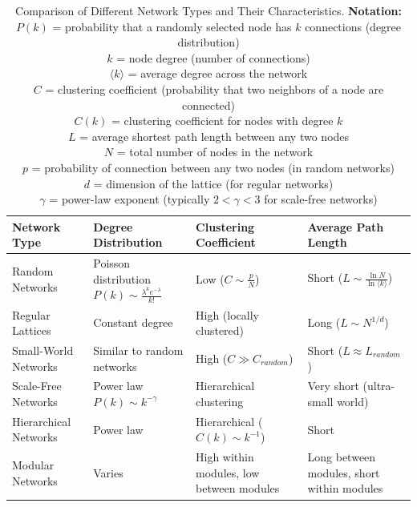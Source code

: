 \begin{table}[htbp]
    \centering
    \begin{tabular}{p{2.5cm}|p{3cm}|p{3cm}|p{3cm}}
        \hline
        \textbf{Network Type} & \textbf{Degree Distribution} & \textbf{Clustering Coefficient} & \textbf{Average Path Length} \\
        \hline
        Random Networks & Poisson distribution $P(k) \sim \frac{\lambda^k e^{-\lambda}}{k!}$ & Low ($C \sim \frac{p}{N}$) & Short ($L \sim \frac{\ln N}{\ln \langle k \rangle}$) \\
        \hline
        Regular Lattices & Constant degree & High (locally clustered) & Long ($L \sim N^{1/d}$) \\
        \hline
        Small-World Networks & Similar to random networks & High ($C \gg C_{random}$) & Short ($L \approx L_{random}$) \\
        \hline
        Scale-Free Networks & Power law $P(k) \sim k^{-\gamma}$ & Hierarchical clustering & Very short (ultra-small world) \\
        \hline
        Hierarchical Networks & Power law & Hierarchical ($C(k) \sim k^{-1}$) & Short \\
        \hline
        Modular Networks & Varies & High within modules, low between modules & Long between modules, short within modules \\
        \hline
    \end{tabular}
    \caption{Comparison of Different Network Types and Their Characteristics.
        \textbf{Notation:}\\
        $P(k)$ = probability that a randomly selected node has $k$ connections (degree distribution)\\
        $k$ = node degree (number of connections)\\
        $\langle k \rangle$ = average degree across the network\\
        $C$ = clustering coefficient (probability that two neighbors of a node are connected)\\
        $C(k)$ = clustering coefficient for nodes with degree $k$\\
        $L$ = average shortest path length between any two nodes\\
        $N$ = total number of nodes in the network\\
        $p$ = probability of connection between any two nodes (in random networks)\\
        $d$ = dimension of the lattice (for regular networks)\\
        $\gamma$ = power-law exponent (typically $2 < \gamma < 3$ for scale-free networks)}
    \label{tab:network_types}
\end{table}

